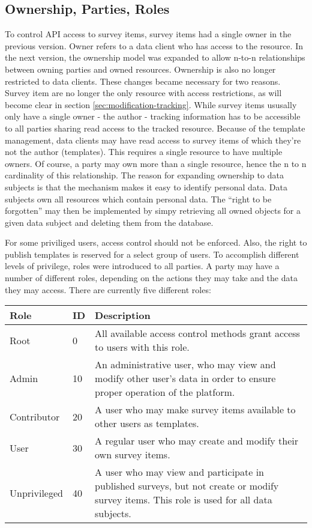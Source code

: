 \subsection{Ownership, Parties, Roles}
    To control API access to survey items, survey items had a single
    owner in the previous version. Owner refers to a data client who has access
    to the resource. In the next version, the ownership model
    was expanded to allow n-to-n relationships between owning parties
    and owned resources. Ownership is also no longer restricted to
    data clients. These changes became necessary for two reasons.
    Survey item are no longer the only resource with access restrictions,
    as will become clear in section \ref{sec:modification-tracking}.
    While survey items ususally only have a single owner - the author - 
    tracking information has to be accessible to all parties sharing
    read access to the tracked resource. Because of the template management,
    data clients may have read access to survey items of which they're not
    the author (templates). This requires a single resource to have multiple owners.
    Of course, a party may own more than a single resource, hence the n to n
    cardinality of this relationship. The reason for expanding ownership
    to data subjects is that the mechanism makes it easy to identify personal
    data. Data subjects own all resources which contain
    personal data. The ``right to be forgotten'' may then be implemented by
    simpy retrieving all owned objects for a given data subject and deleting 
    them from the database.

    For some priviliged users, access control should not be enforced.
    Also, the right to publish templates is reserved for a select
    group of users. To accomplish different levels of privilege,
    roles were introduced to all parties. A party may have a number
    of different roles, depending on the actions they may take and
    the data they may access. There are currently five different roles:

    \begin{table}[H]
        \begin{tabularx}{\textwidth}{|l|l|X|}
            \hline
            Role & ID & Description \\
            \hline \hline
            Root & 0 & All available access control methods grant access to users with this role. \\
            Admin & 10 & An administrative user, who may view and modify other user's data in order to ensure proper operation of the platform. \\
            Contributor & 20 & A user who may make survey items available to other users as templates. \\
            User & 30 & A regular user who may create and modify their own survey items. \\
            Unprivileged & 40 & A user who may view and participate in published surveys, but not create or modify survey items. This role is used for all data subjects.\\
            \hline
        \end{tabularx}
    \end{table}

